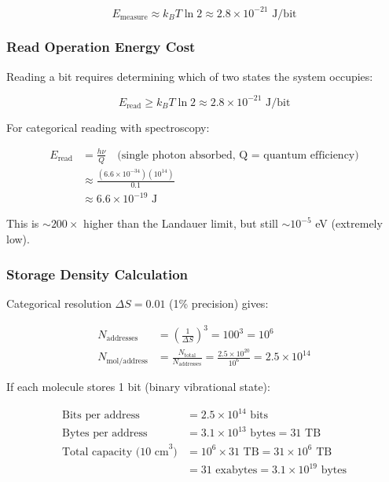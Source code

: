 \begin{equation}
E_{\text{measure}} \approx k_B T \ln 2 \approx 2.8 \times 10^{-21} \text{ J/bit}
\end{equation}

\subsubsection{Read Operation Energy Cost}

Reading a bit requires determining which of two states the system occupies:

\begin{equation}
E_{\text{read}} \geq k_B T \ln 2 \approx 2.8 \times 10^{-21} \text{ J/bit}
\end{equation}

For categorical reading with spectroscopy:

\begin{align}
E_{\text{read}} &= \frac{h\nu}{Q} \quad \text{(single photon absorbed, Q = quantum efficiency)} \\
&\approx \frac{(6.6 \times 10^{-34})(10^{14})}{0.1} \\
&\approx 6.6 \times 10^{-19} \text{ J}
\end{align}

This is $\sim 200\times$ higher than the Landauer limit, but still $\sim 10^{-5}$ eV (extremely low).

\subsubsection{Storage Density Calculation}

Categorical resolution $\Delta S = 0.01$ (1\% precision) gives:

\begin{align}
N_{\text{addresses}} &= \left(\frac{1}{\Delta S}\right)^3 = 100^3 = 10^6 \\
N_{\text{mol/address}} &= \frac{N_{\text{total}}}{N_{\text{addresses}}} = \frac{2.5 \times 10^{20}}{10^6} = 2.5 \times 10^{14}
\end{align}

If each molecule stores 1 bit (binary vibrational state):

\begin{align}
\text{Bits per address} &= 2.5 \times 10^{14} \text{ bits} \\
\text{Bytes per address} &= 3.1 \times 10^{13} \text{ bytes} = 31 \text{ TB} \\
\text{Total capacity (10 cm}^3\text{)} &= 10^6 \times 31 \text{ TB} = 31 \times 10^6 \text{ TB} \\
&= 31 \text{ exabytes} = 3.1 \times 10^{19} \text{ bytes}
\end{align}

